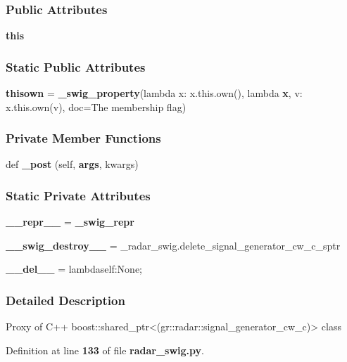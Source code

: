 \subsubsection*{Public Attributes}
\begin{DoxyCompactItemize}
\item 
{\bf this}
\end{DoxyCompactItemize}
\subsubsection*{Static Public Attributes}
\begin{DoxyCompactItemize}
\item 
{\bf thisown} = {\bf \+\_\+swig\+\_\+property}(lambda x\+: x.\+this.\+own(), lambda {\bf x}, v\+: x.\+this.\+own(v), doc=\textquotesingle{}The membership flag\textquotesingle{})
\end{DoxyCompactItemize}
\subsubsection*{Private Member Functions}
\begin{DoxyCompactItemize}
\item 
def {\bf \+\_\+post} (self, {\bf args}, kwargs)
\end{DoxyCompactItemize}
\subsubsection*{Static Private Attributes}
\begin{DoxyCompactItemize}
\item 
{\bf \+\_\+\+\_\+repr\+\_\+\+\_\+} = {\bf \+\_\+swig\+\_\+repr}
\item 
{\bf \+\_\+\+\_\+swig\+\_\+destroy\+\_\+\+\_\+} = \+\_\+radar\+\_\+swig.\+delete\+\_\+signal\+\_\+generator\+\_\+cw\+\_\+c\+\_\+sptr
\item 
{\bf \+\_\+\+\_\+del\+\_\+\+\_\+} = lambdaself\+:\+None;
\end{DoxyCompactItemize}


\subsubsection{Detailed Description}
\begin{DoxyVerb}Proxy of C++ boost::shared_ptr<(gr::radar::signal_generator_cw_c)> class\end{DoxyVerb}
 

Definition at line {\bf 133} of file {\bf radar\+\_\+swig.\+py}.



